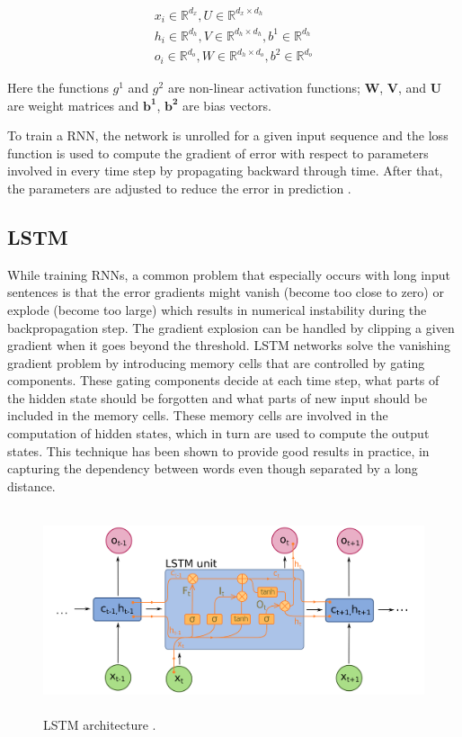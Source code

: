 \documentclass[a4paper, 11pt]{article}
\begin{document}
\begin{align*}
x_i \in \mathbb{R}^{d_x}, U \in \mathbb{R}^{d_x \times d_h} \\
h_i \in \mathbb{R}^{d_h}, V \in \mathbb{R}^{d_h \times d_h}, b^1 \in \mathbb{R}^{d_h} \\
o_i \in \mathbb{R}^{d_o}, W \in \mathbb{R}^{d_h \times d_o}, b^2 \in \mathbb{R}^{d_o}
\end{align*}

Here the functions $g^{1}$ and $g^{2}$ are non-linear activation functions; $\mathbf{W}$, $\mathbf{V}$, and $\mathbf{U}$ are weight matrices and $\mathbf{b^{1}}$, $\mathbf{b^{2}}$ are bias vectors. 

To train a RNN, the network is unrolled for a given input sequence and the loss function is used to compute the gradient of error with respect to parameters involved in every time step by propagating backward through time. After that, the parameters are adjusted to reduce the error in prediction \parencite{Werbos1990}. 

\subsection{LSTM}

While training RNNs, a common problem that especially occurs with long input sentences is that the error gradients might vanish (become too close to zero) or explode (become too large) which results in numerical instability during the backpropagation step. The gradient explosion can be handled by clipping a given gradient when it goes beyond the threshold. LSTM networks \parencite{Hochreiter1997} solve the vanishing gradient problem by introducing memory cells that are controlled by gating components. These gating components decide at each time step, what parts of the hidden state should be forgotten and what parts of new input should be included in the memory cells. These memory cells are involved in the computation of hidden states, which in turn are used to compute the output states. This technique has been shown to provide good results in practice, in capturing the dependency between words even though separated by a long distance.

\begin{figure}[htpb!]
    \centering
    \includegraphics[width=\textwidth,height=6cm,keepaspectratio=true]
    {lstm-1.png}
    \caption{
        LSTM architecture \parencite{rnn-2}.
    }
    \label{fig:LSTM architecture}
\end{figure}
\end{document}
